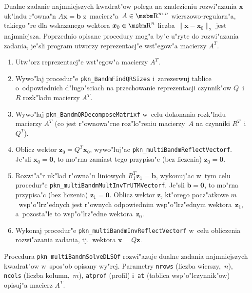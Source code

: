 \begin{sloppypar}
Dualne zadanie najmniejszych kwadrat"ow polega na znalezieniu rozwi"azania
$\bm{x}$ uk"ladu r"owna"n $A\bm{x}=\bm{b}$ z~macierz"a~$A\in\R^{m,n}$
wierszowo-regularn"a, takiego "re dla wskazanego wektora $\bm{x}_0\in\R^n$
liczba $\|\bm{x}-\bm{x}_0\|_2$ jest najmniejsza. Poprzednio opisane
procedury mog"a by"c u"ryte do rozwi"azania zadania, je"sli program utworzy
reprezentacj"e wst"egow"a macierzy $A^T$.
\end{sloppypar}
\begin{enumerate}
  \item Utw"orz reprezentacj"e wst"egow"a macierzy $A^T$.
  \item Wywo"laj procedur"e \texttt{pkn\_BandmFindQRSizes} i~zarezerwuj
    tablice o~odpowiednich d"lugo"sciach na przechowanie reprezentacji
    czynnik"ow $Q$~i~$R$ rozk"ladu macierzy $A^T$.
  \item Wywo"laj \texttt{pkn\_BandmQRDecomposeMatrixf} w~celu dokonania
    rozk"ladu macierzy $A^T$ (co jest r"ownowa"rne roz"lo"reniu macierzy~$A$
    na czynniki $R^T$~i~$Q^T$).
  \item Oblicz wektor $\bm{z}_0=Q^T\bm{x}_0$, wywo"luj"ac
    \texttt{pkn\_multiBandmReflectVectorf}. Je"sli $\bm{x}_0=\bm{0}$, to mo"rna
    zamiast tego przypisa"c (bez liczenia) $\bm{z}_0=\bm{0}$.
  \item Rozwi"a"r uk"lad r"owna"n liniowych $R_1^T\bm{z}_1=\bm{b}$,
    wykonuj"ac w~tym celu procedur"e
    \texttt{pkn\_multiBandmMultInvTrUTMVectorf}. Je"sli
    $\bm{b}=\bm{0}$, to mo"rna przypisa"c (bez liczenia) $\bm{z}_1=\bm{0}$.
    Oblicz wektor $\bm{z}$, kt"orego pocz"atkowe $m$~wsp"o"lrz"ednych
    jest r"ownych odpowiednim wsp"o"lrz"ednym wektora~$\bm{z}_1$,
    a~pozosta"le to wsp"o"lrz"edne wektora~$\bm{z}_0$.
  \item Wykonaj procedur"e \texttt{pkn\_multiBandmInvReflectVectorf} w~celu
    obliczenia rozwi"azania zadania, tj.\ wektora $\bm{x}=Q\bm{z}$.
\end{enumerate}

\vspace{\bigskipamount}
\begin{sloppypar}
Procedura \texttt{pkn\_multiBandmSolveDLSQf} rozwi"azuje dualne zadania
najmniejszych kwadrat"ow w~spos"ob opisany wy"rej. Parametry \texttt{nrows}
(liczba wierszy,~$n$), \texttt{ncols} (liczba kolumn,~$m$), \texttt{atprof}
(profil) i~\texttt{at} (tablica wsp"o"lczynnik"ow) opisuj"a macierz $A^T$.
\end{sloppypar}

